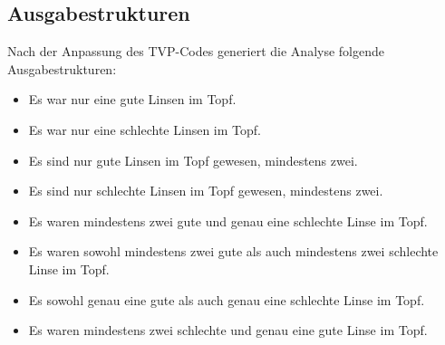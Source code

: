 \subsection{Ausgabestrukturen}
Nach der Anpassung des TVP-Codes generiert die Analyse folgende Ausgabestrukturen:
\begin{itemize}[$\rightarrow$]
	\item Es war nur eine gute Linsen im Topf.
	\item Es war nur eine schlechte Linsen im Topf.
	\item Es sind nur gute Linsen im Topf gewesen, mindestens zwei.
	\item Es sind nur schlechte Linsen im Topf gewesen, mindestens zwei.
	\item Es waren mindestens zwei gute und genau eine schlechte Linse im Topf.
	\item Es waren sowohl mindestens zwei gute als auch mindestens zwei schlechte Linse im Topf.
	\item Es sowohl genau eine gute als auch genau eine schlechte Linse im Topf.
	\item Es waren mindestens zwei schlechte und genau eine gute Linse im Topf.
\end{itemize}